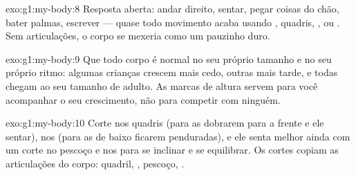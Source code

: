\begin{solution}{exo:g1:my-body:8}
Resposta aberta: andar direito, sentar, pegar coisas do chão, bater
palmas, escrever --- quase todo movimento acaba usando ,
quadris, ,  ou . Sem articulações, o corpo se
mexeria como um pauzinho duro.
\end{solution}

\begin{solution}{exo:g1:my-body:9}
Que todo corpo é normal no seu próprio tamanho e no seu próprio
ritmo: algumas crianças crescem mais cedo, outras mais tarde, e
todas chegam ao seu tamanho de adulto. As marcas de altura servem
para você acompanhar o seu crescimento, não para competir com
ninguém.
\end{solution}

\begin{solution}{exo:g1:my-body:10}
Corte nos quadris (para as  dobrarem para a frente e ele
sentar), nos  (para as  de baixo ficarem penduradas), e
ele senta melhor ainda com um corte no pescoço e nos  para se
inclinar e se equilibrar. Os cortes copiam as articulações do corpo:
quadril, , pescoço, .
\end{solution}
